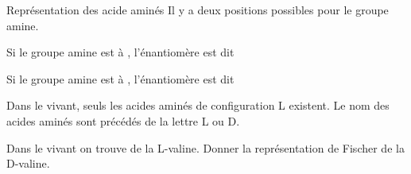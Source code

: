 \begin{doc}{Représentation des acide aminés}
  Il y a deux positions possibles pour le groupe amine.
  \begin{importants}
    \begin{listePoints}
      \item Si le groupe amine est à , l'énantiomère est dit 
      \item Si le groupe amine est à , l'énantiomère est dit 
    \end{listePoints}
  \end{importants}

  Dans le vivant, seuls les acides aminés de configuration L existent.
  Le nom des acides aminés sont précédés de la lettre L ou D.
\end{doc}

\schematiser
Dans le vivant on trouve de la L-valine.
Donner la représentation de Fischer de la D-valine.
\smallskip

\begin{minipage}[T]{0.48\linewidth}
  \centering
\end{minipage}
\smallskip


